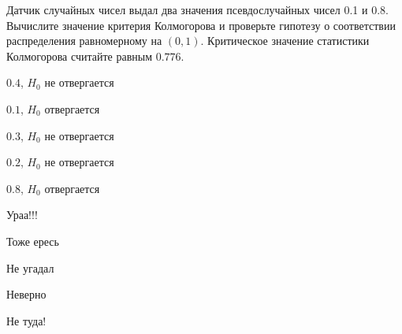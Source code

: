 
\begin{question}
Датчик случайных чисел выдал два значения псевдослучайных чисел 0.1 и
0.8. Вычислите значение критерия Колмогорова и проверьте гипотезу о
соответствии распределения равномерному на \((0,1)\). Критическое
значение статистики Колмогорова считайте равным \(0.776\).
\begin{answerlist}
  \item \(0.4\), \(H_0\) не отвергается
  \item \(0.1\), \(H_0\) отвергается
  \item \(0.3\), \(H_0\) не отвергается
  \item \(0.2\), \(H_0\) не отвергается
  \item \(0.8\), \(H_0\) отвергается
\end{answerlist}
\end{question}

\begin{solution}
\begin{answerlist}
  \item Ураа!!!
  \item Тоже ересь
  \item Не угадал
  \item Неверно
  \item Не туда!
\end{answerlist}
\end{solution}

